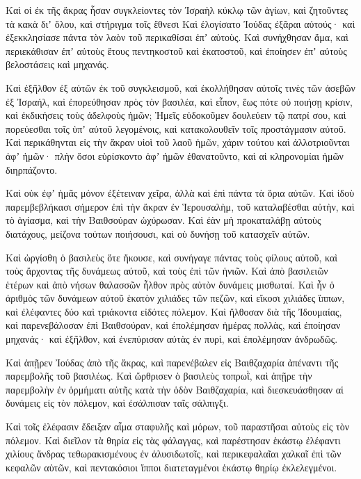 {\par }{\PP {}Καὶ οἱ ἐκ τῆς ἄκρας ἦσαν συγκλείοντες τὸν Ἰσραὴλ κύκλῳ τῶν ἁγίων, καὶ ζητοῦντες τὰ κακὰ διʼ ὅλου, καὶ στήριγμα τοῖς ἔθνεσι
Καὶ ἐλογίσατο Ἰούδας ἐξᾶραι αὐτούς· καὶ ἐξεκκλησίασε πάντα τὸν λαὸν τοῦ περικαθίσαι ἐπʼ αὐτοὺς.
Καὶ συνήχθησαν ἅμα, καὶ περιεκάθισαν ἐπʼ αὐτοὺς ἔτους πεντηκοστοῦ καὶ ἑκατοστοῦ, καὶ ἐποίησεν ἐπʼ αὐτοὺς βελοστάσεις καὶ μηχανάς.
\par }{\PP {}Καὶ ἐξῆλθον ἐξ αὐτῶν ἐκ τοῦ συγκλεισμοῦ, καὶ ἐκολλήθησαν αὐτοῖς τινὲς τῶν ἀσεβῶν ἐξ Ἰσραήλ,
καὶ ἐπορεύθησαν πρὸς τὸν βασιλέα, καὶ εἶπον, ἕως πότε οὐ ποιήσῃ κρίσιν, καὶ ἐκδικήσεις τοὺς ἀδελφοὺς ἡμῶν;
Ἡμεῖς εὐδοκοῦμεν δουλεύειν τῷ πατρί σου, καὶ πορεύεσθαι τοῖς ὑπʼ αὐτοῦ λεγομένοις, καὶ κατακολουθεῖν τοῖς προστάγμασιν αὐτοῦ.
Καὶ περικάθηνται εἰς τὴν ἄκραν υἱοὶ τοῦ λαοῦ ἡμῶν, χάριν τούτου καὶ ἀλλοτριοῦνται ἀφʼ ἡμῶν· πλὴν ὅσοι εὑρίσκοντο ἀφʼ ἡμῶν ἐθανατοῦντο, καὶ αἱ κληρονομίαι ἡμῶν διηρπάζοντο.
\par }{\PP {}Καὶ οὐκ ἐφʼ ἡμᾶς μόνον ἐξέτειναν χεῖρα, ἀλλὰ καὶ ἐπὶ πάντα τὰ ὅρια αὐτῶν.
Καὶ ἰδοὺ παρεμβεβλήκασι σήμερον ἐπὶ τὴν ἄκραν ἐν Ἱερουσαλὴμ, τοῦ καταλαβέσθαι αὐτὴν, καὶ τὸ ἁγίασμα, καὶ τὴν Βαιθσούραν ὠχύρωσαν.
Καὶ ἐὰν μὴ προκαταλάβῃ αὐτοὺς διατάχους, μείζονα τούτων ποιήσουσι, καὶ οὐ δυνήσῃ τοῦ κατασχεῖν αὐτῶν.
\par }{\PP {}Καὶ ὠργίσθη ὁ βασιλεὺς ὅτε ἤκουσε, καὶ συνήγαγε πάντας τοὺς φίλους αὐτοῦ, καὶ τοὺς ἄρχοντας τῆς δυνάμεως αὐτοῦ, καὶ τοὺς ἐπὶ τῶν ἡνιῶν.
Καὶ ἀπὸ βασιλειῶν ἑτέρων καὶ ἀπὸ νήσων θαλασσῶν ἦλθον πρὸς αὐτὸν δυνάμεις μισθωταί.
Καὶ ἦν ὁ ἀριθμὸς τῶν δυνάμεων αὐτοῦ ἑκατὸν χιλιάδες τῶν πεζῶν, καὶ εἴκοσι χιλιάδες ἵππων, καὶ ἐλέφαντες δύο καὶ τριάκοντα εἰδότες πόλεμον.
Καὶ ἤλθοσαν διὰ τῆς Ἰδουμαίας, καὶ παρενεβάλοσαν ἐπὶ Βαιθσούραν, καὶ ἐπολέμησαν ἡμέρας πολλὰς, καὶ ἐποίησαν μηχανάς· καὶ ἐξῆλθον, καὶ ἐνεπύρισαν αὐτὰς ἐν πυρὶ, καὶ ἐπολέμησαν ἀνδρωδῶς.
\par }{\PP {}Καὶ ἀπῇρεν Ἰούδας ἀπὸ τῆς ἄκρας, καὶ παρενέβαλεν εἰς Βαιθζαχαρία ἀπέναντι τῆς παρεμβολῆς τοῦ βασιλέως.
Καὶ ὤρθρισεν ὁ βασιλεὺς τοπρωῒ, καὶ ἀπῇρε τὴν παρεμβολὴν ἐν ὁρμήματι αὐτῆς κατὰ τὴν ὁδὸν Βαιθζαχαρία, καὶ διεσκευάσθησαν αἱ δυνάμεις εἰς τὸν πόλεμον, καὶ ἐσάλπισαν ταῖς σάλπιγξι.
\par }{\PP {}Καὶ τοῖς ἐλέφασιν ἔδειξαν αἷμα σταφυλῆς καὶ μόρων, τοῦ παραστῆσαι αὐτοὺς εἰς τὸν πόλεμον.
Καὶ διεῖλον τὰ θηρία εἰς τὰς φάλαγγας, καὶ παρέστησαν ἑκάστῳ ἐλέφαντι χιλίους ἄνδρας τεθωρακισμένους ἐν ἁλυσιδωτοῖς, καὶ περικεφαλαῖαι χαλκαῖ ἐπὶ τῶν κεφαλῶν αὐτῶν, καὶ πεντακόσιοι ἵπποι διατεταγμένοι ἑκάστῳ θηρίῳ ἐκλελεγμένοι.
}
